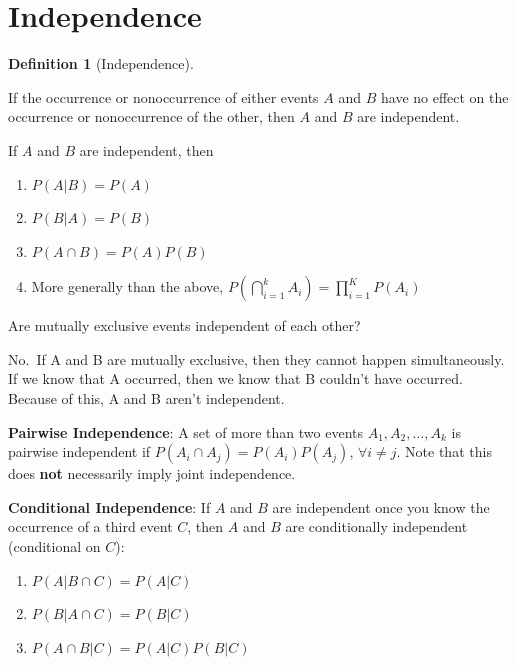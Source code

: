 \documentclass[
  letterpaper,
]{book}
\providecommand{\tightlist}{%
  \setlength{\itemsep}{0pt}\setlength{\parskip}{0pt}}\usepackage{longtable,booktabs,array}
\theoremstyle{definition}
\newtheorem{definition}{Definition}[chapter]
\theoremstyle{definition}
\theoremstyle{plain}
\theoremstyle{definition}
\theoremstyle{plain}
\theoremstyle{plain}
\theoremstyle{remark}
\begin{document}
\hypertarget{independence}{%
\section{Independence}\label{independence}}

\leavevmode{}%
\begin{definition}[Independence]\label{def-}

If the occurrence or nonoccurrence of either events \(A\) and \(B\) have
no effect on the occurrence or nonoccurrence of the other, then \(A\)
and \(B\) are independent.

\end{definition}

If \(A\) and \(B\) are independent, then

\hypertarget{prop-}{}
\begin{enumerate}
\def\labelenumi{\arabic{enumi}.}
\tightlist
\item
  \(P(A|B)=P(A)\)
\item
  \(P(B|A)=P(B)\)
\item
  \(P(A\cap B)=P(A)P(B)\)
\item
  More generally than the above,
  \(P(\bigcap_{i=1}^k A_i) = \prod_{i = 1}^K P(A_i)\)
\end{enumerate}

Are mutually exclusive events independent of each other?

No.~If A and B are mutually exclusive, then they cannot happen
simultaneously. If we know that A occurred, then we know that B couldn't
have occurred. Because of this, A and B aren't independent.

\textbf{Pairwise Independence}: A set of more than two events
\(A_1, A_2, \dots, A_k\) is pairwise independent if
\(P(A_i\cap A_j)=P(A_i)P(A_j)\), \(\forall i\neq j\). Note that this
does \textbf{not} necessarily imply joint independence.

\textbf{Conditional Independence}: If \(A\) and \(B\) are independent
once you know the occurrence of a third event \(C\), then \(A\) and
\(B\) are conditionally independent (conditional on \(C\)):

\begin{enumerate}
\def\labelenumi{\arabic{enumi}.}
\tightlist
\item
  \(P(A|B \cap C)=P(A|C)\)
\item
  \(P(B|A \cap C)=P(B|C)\)
\item
  \(P(A\cap B|C)=P(A|C)P(B|C)\)
\end{enumerate}
\end{document}
